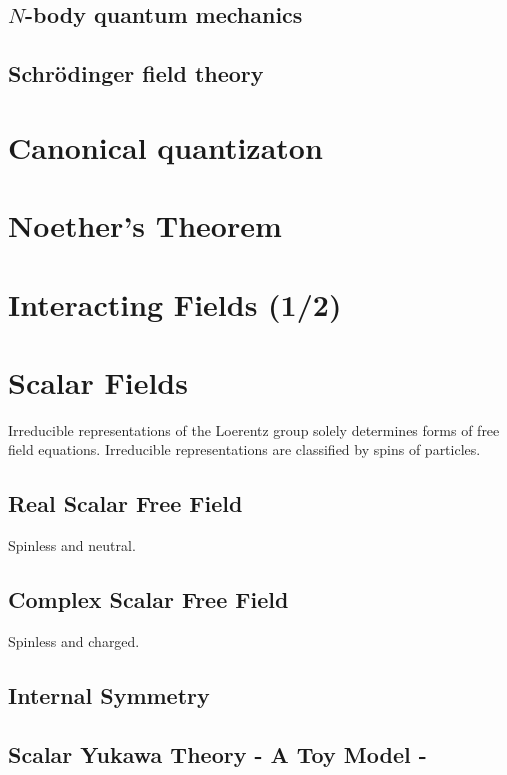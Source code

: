 \documentclass[12pt]{article}
\newcommand{\myqftsrcdirectory}[0]{myqft/src}
\newcommand{\mainqftsrcdirectory}[0]{src_qft}
\newcommand{\srcseventeen}[0]{myqft/versions/2017}
\begin{document}
\subsection{$N$-body quantum mechanics}

\subsection{Schr\"odinger field theory}

\section{Canonical quantizaton}

\section{Noether's Theorem}

\section{Interacting Fields (1/2)}


\section{Scalar Fields}
Irreducible representations of the Loerentz group solely 
determines forms of free field equations.
Irreducible representations are classified by
spins of particles.
\subsection{Real Scalar Free Field}
Spinless and neutral.
%

\subsection{Complex Scalar Free Field}
Spinless and charged.

\subsection{Internal Symmetry}

\subsection{Scalar Yukawa Theory - A Toy Model -}
\label{sec:ScYukawa}

\end{document}
